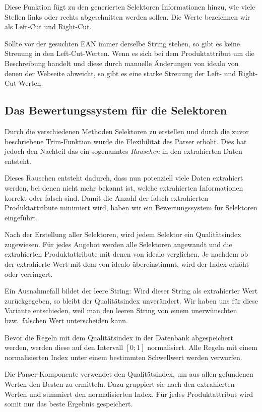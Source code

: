 Diese Funktion fügt zu den generierten Selektoren Informationen hinzu, wie viele Stellen links oder rechts
abgeschnitten werden sollen.
Die Werte bezeichnen wir als Left-Cut und Right-Cut.

Sollte vor der gesuchten EAN immer derselbe String stehen, so gibt es keine Streuung in den Left-Cut-Werten.
Wenn es sich bei dem Produktattribut um die Beschreibung handelt und diese durch manuelle Änderungen von idealo von
denen der Webseite abweicht, so gibt es eine starke Streuung der Left- und Right-Cut-Werten.

\subsection{Das Bewertungssystem für die Selektoren}
\label{subsec:bewertungssystem}

Durch die verschiedenen Methoden Selektoren zu erstellen und durch die zuvor beschriebene Trim-Funktion wurde die
Flexibilität des Parser erhöht.
Dies hat jedoch den Nachteil das ein sogenanntes \textit{Rauschen} in den extrahierten Daten entsteht.

Dieses Rauschen entsteht dadurch, dass nun potenziell viele Daten extrahiert werden, bei denen nicht mehr bekannt
ist, welche extrahierten Informationen korrekt oder falsch sind.
Damit die Anzahl der falsch extrahierten Produktattribute minimiert wird, haben wir ein Bewertungssystem für
Selektoren eingeführt.

Nach der Erstellung aller Selektoren, wird jedem Selektor ein Qualitätsindex zugewiesen.
Für jedes Angebot werden alle Selektoren angewandt und die extrahierten Produktattribute mit denen von idealo
verglichen.
Je nachdem ob der extrahierte Wert mit dem von idealo übereinstimmt, wird der Index erhöht oder verringert.

Ein Ausnahmefall bildet der leere String: Wird dieser String als extrahierter Wert zurückgegeben, so bleibt der
Qualitätsindex unverändert.
Wir haben uns für diese Variante entschieden, weil man den leeren String von einem unerwünschten bzw.\
falschen Wert unterscheiden kann.

Bevor die Regeln mit dem Qualitätsindex in der Datenbank abgespeichert werden, werden diese auf den Intervall $[0; 1]$
normalisiert.
Alle Regeln mit einem normalisierten Index unter einem bestimmten Schwellwert werden verworfen.

Die Parser-Komponente verwendet den Qualitätsindex, um aus allen gefundenen Werten den Besten zu ermitteln.
Dazu gruppiert sie nach den extrahierten Werten und summiert den normalisierten Index.
Für jedes Produktattribut wird somit nur das beste Ergebnis gespeichert.